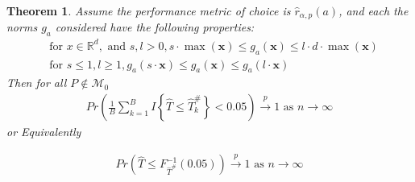\documentclass{article}
\newtheorem{theorem}{Theorem}
\begin{document}
\begin{theorem}
\label{thm:cnst}
Assume the performance metric of choice is $\hat{r}_{\alpha, p}(a)$, and each the norms $g_a$ considered have the following properties: 
\begin{align}
& \text{for } x \in \mathbb{R}^d, \text{ and } s, l > 0, s \cdot \max({\boldsymbol{x}}) \leq g_a(\boldsymbol{x}) \leq l \cdot d \cdot \max({\boldsymbol{x}}) \label{eqn:nrm_bounds}\\
& \text{for } s \leq 1, l \geq 1, g_a(s \cdot \boldsymbol{x}) \leq g_a(\boldsymbol{x}) \leq g_a(l \cdot \boldsymbol{x}) \label{eqn:linegrowth}
\end{align}
Then for all $P \not \in \mathscr{M}_0$ 
\begin{align*}
	Pr \left(\frac{1}{B}\sum_{k = 1}^B I\left\{\hat{T} \leq \hat{T}_k^{\#}\right\} < 0.05\right) \xrightarrow{p} 1 \text{ as } n \to \infty
\end{align*}
or Equivalently 

\begin{align*}
Pr\left(\hat{T} \leq F^{-1}_{\hat{T}^\#}(0.05)\right) \xrightarrow{p} 1 \text{ as } n \to \infty
\end{align*}
\end{theorem}
\end{document}
